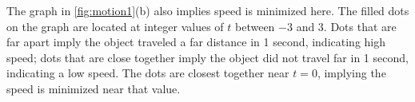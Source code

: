 {\begin{enumerate}
	The graph in \autoref{fig:motion1}(b) also implies speed is minimized here. The filled dots on the graph are located at integer values of $t$ between $-3$ and 3. Dots that are far apart imply the object traveled a far distance in 1 second, indicating high speed; dots that are close together imply the object did not travel far in 1 second, indicating a low speed. The dots are closest together near $t=0$, implying the speed is minimized near that value.
\end{enumerate}}

